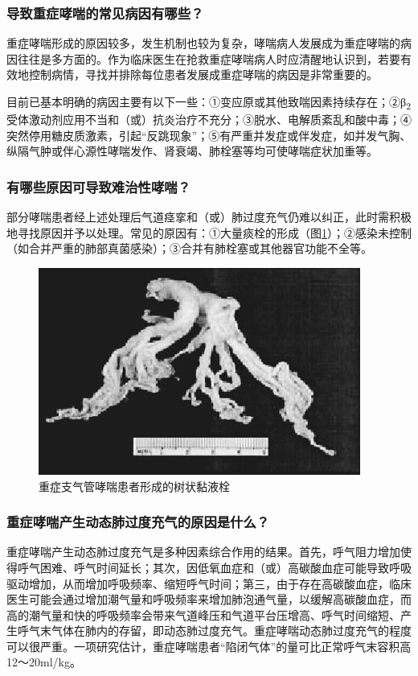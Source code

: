\subsubsection{导致重症哮喘的常见病因有哪些？}

重症哮喘形成的原因较多，发生机制也较为复杂，哮喘病人发展成为重症哮喘的病因往往是多方面的。作为临床医生在抢救重症哮喘病人时应清醒地认识到，若要有效地控制病情，寻找并排除每位患者发展成重症哮喘的病因是非常重要的。

目前已基本明确的病因主要有以下一些：①变应原或其他致喘因素持续存在；②β\textsubscript{2}
受体激动剂应用不当和（或）抗炎治疗不充分；③脱水、电解质紊乱和酸中毒；④突然停用糖皮质激素，引起“反跳现象”；⑤有严重并发症或伴发症，如并发气胸、纵隔气肿或伴心源性哮喘发作、肾衰竭、肺栓塞等均可使哮喘症状加重等。

\subsubsection{有哪些原因可导致难治性哮喘？}

部分哮喘患者经上述处理后气道痉挛和（或）肺过度充气仍难以纠正，此时需积极地寻找原因并予以处理。常见的原因有：①大量痰栓的形成（图\ref{fig7-1}）；②感染未控制（如合并严重的肺部真菌感染）；③合并有肺栓塞或其他器官功能不全等。

\begin{figure}[!htbp]
 \centering
 \includegraphics{./images/Image00057.jpg}
 \captionsetup{justification=centering}
 \caption{重症支气管哮喘患者形成的树状黏液栓}
 \label{fig7-1}
  \end{figure} 

\subsubsection{重症哮喘产生动态肺过度充气的原因是什么？}

重症哮喘产生动态肺过度充气是多种因素综合作用的结果。首先，呼气阻力增加使得呼气困难、呼气时间延长；其次，因低氧血症和（或）高碳酸血症可能导致呼吸驱动增加，从而增加呼吸频率、缩短呼气时间；第三，由于存在高碳酸血症，临床医生可能会通过增加潮气量和呼吸频率来增加肺泡通气量，以缓解高碳酸血症，而高的潮气量和快的呼吸频率会带来气道峰压和气道平台压增高、呼气时间缩短、产生呼气末气体在肺内的存留，即动态肺过度充气。重症哮喘动态肺过度充气的程度可以很严重。一项研究估计，重症哮喘患者“陷闭气体”的量可比正常呼气末容积高12～20ml/kg。

